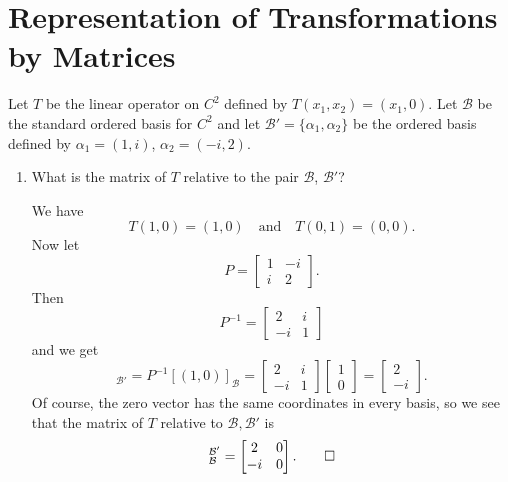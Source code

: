 \section{Representation of Transformations by Matrices}

 Let $T$ be the linear operator on $C^2$ defined by
$T(x_1, x_2) = (x_1, 0)$. Let $\mathcal{B}$ be the standard ordered
basis for $C^2$ and let $\mathcal{B}' = \{\alpha_1,\alpha_2\}$ be the
ordered basis defined by $\alpha_1 = (1, i)$, $\alpha_2 = (-i, 2)$.
\begin{enumerate}
\item What is the matrix of $T$ relative to the pair $\mathcal{B}$,
  $\mathcal{B}'$?
  \begin{solution}
    We have
    \begin{equation*}
      T(1, 0) = (1, 0)
      \quad\text{and}\quad
      T(0, 1) = (0, 0).
    \end{equation*}
    Now let
    \begin{equation*}
      P =
      \begin{bmatrix}
        1 & -i \\
        i & 2
      \end{bmatrix}.
    \end{equation*}
    Then
    \begin{equation*}
      P^{-1} =
      \begin{bmatrix}
        2 & i \\
        -i & 1
      \end{bmatrix}
    \end{equation*}
    and we get
    \begin{equation*}
      [(1, 0)]_{\mathcal{B}'}
      = P^{-1}[(1,0)]_{\mathcal{B}}
      =
      \begin{bmatrix}
        2 & i \\
        -i & 1
      \end{bmatrix}
      \begin{bmatrix}
        1 \\ 0
      \end{bmatrix}
      =
      \begin{bmatrix}
        2 \\ -i
      \end{bmatrix}.
    \end{equation*}
    Of course, the zero vector has the same coordinates in every
    basis, so we see that the matrix of $T$ relative to
    $\mathcal{B},\mathcal{B}'$ is
    \begin{equation*}
      [T]_{\mathcal{B}}^{\mathcal{B}'} =
      \begin{bmatrix}
        2 & 0 \\
        -i & 0
      \end{bmatrix}. \qedhere
    \end{equation*}
  \end{solution}


\end{enumerate}
